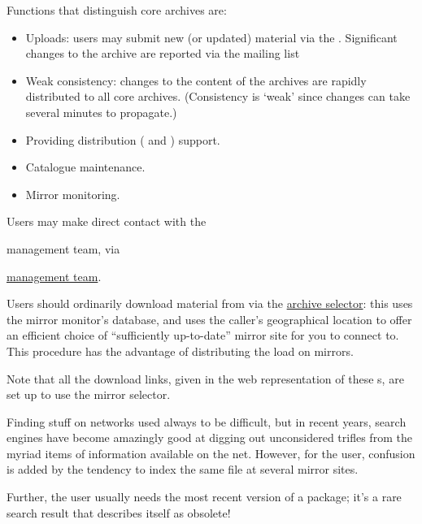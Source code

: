 Functions that distinguish core archives are:
\begin{itemize}
\item Uploads: users may submit new (or updated) material via the
  . Significant changes to the
  archive are reported via the mailing list 
\item Weak consistency: changes to the content of the archives are
  rapidly distributed to all core archives.  (Consistency is `weak'
  since changes can take several minutes to propagate.)
\item Providing distribution (\texlive{} and \miktex{}) support.
\item Catalogue maintenance.
\item Mirror monitoring.
\end{itemize}

Users may make direct contact with the
\begin{flatversion}
  \ctan{} management team, via 
\end{flatversion}
\begin{hyperversion}
  \href{mailto:ctan@dante.de}{\ctan{} management team}.
\end{hyperversion}

Users should ordinarily download material from  via the
\href*{http://mirror.ctan.org/}{archive selector}: this uses the
mirror monitor's database, and uses the caller's geographical location to
offer an efficient choice of ``sufficiently up-to-date'' mirror site for
you to connect to.  This procedure has the advantage of distributing
the load on \ctan{} mirrors.

Note that all the download links, given in the web representation of
these s, are set up to use the mirror selector.


Finding stuff on networks used always to be difficult, but in recent years,
search engines have become amazingly good at digging out unconsidered
trifles from the myriad items of information available on the net.
However, for the \alltex{} user, confusion is added by the tendency to
index the same file at several  mirror sites.

Further, the \alltex{} user usually needs the most recent version of a
package; it's a rare search result that describes itself as obsolete!

